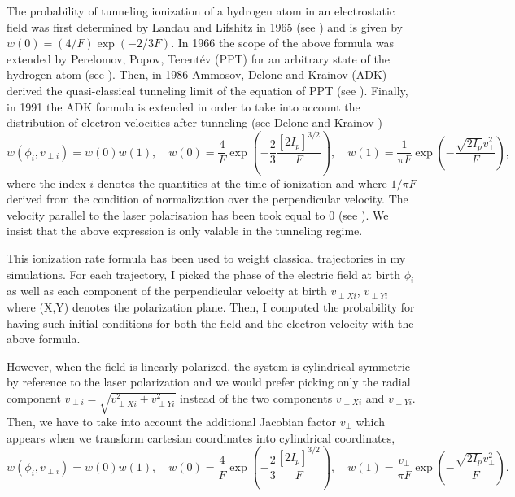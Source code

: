 \documentclass[a4paper]{article}
\begin{document}
The probability of tunneling ionization of a hydrogen atom in an electrostatic field was first determined by Landau and Lifshitz in 1965 (see \cite{Landau_1965}) and is given by $w(0)=(4/F)\exp(-2/3F)$. In 1966 the scope of the above formula was extended by Perelomov, Popov, Terent\'ev (PPT) for an arbitrary state of the hydrogen atom (see \cite{PPT_1966}). Then, in 1986 Ammosov, Delone and Krainov (ADK) derived the quasi-classical tunneling limit of the equation of PPT (see \cite{ADK_1986}). Finally, in 1991 the ADK formula is extended in order to take into account the distribution of electron velocities after tunneling (see Delone and Krainov \cite{Delone_1991})
\begin{equation} 
\label{ADK_distribution}
w(\phi_{i},v_{\perp i})=w(0)w(1), \quad w(0)=\frac{4}{F}\exp(-\frac{2}{3}\frac{[2I_{p}]^{3/2}}{F}), \quad w(1)=\frac{1}{\pi F}\exp(-\frac{\sqrt{2I_{p}}v_{\perp}^{2}}{F}),
\end{equation}
where the index $i$ denotes the quantities at the time of ionization and where $1/\pi F$ derived from the condition of normalization over the perpendicular velocity. 
The velocity parallel to the laser polarisation has been took equal to 0 (see \cite{Hu_1997}). We insist that the above expression is only valable in the tunneling regime.
\par
This ionization rate formula has been used to weight classical trajectories in my simulations. For each trajectory, I picked the phase of the electric field at birth $\phi_{i}$ as well as each component of the perpendicular velocity at birth $v_{\perp X i}$, $v_{\perp Y i}$ where (X,Y) denotes the polarization plane. Then, I computed the probability for having such initial conditions for both the field and the electron velocity with the above formula.
\par
However, when the field is linearly polarized, the system is cylindrical symmetric by reference to the laser polarization and we would prefer picking only the radial component $v_{\perp i}=\sqrt{v_{\perp X i}^{2} + v_{\perp Y i}^{2}}$ instead of the two components $v_{\perp X i}$ and $v_{\perp Y i}$. Then, we have to take into account the additional Jacobian factor $v_{\perp}$ which appears when we transform cartesian coordinates into cylindrical coordinates,
\begin{equation}
w(\phi_{i},v_{\perp i})=w(0)\bar w(1), \quad w(0)=\frac{4}{F}\exp(-\frac{2}{3}\frac{[2I_{p}]^{3/2}}{F}), \quad \bar w(1)=\frac{v_{\perp}}{\pi F}\exp(-\frac{\sqrt{2I_{p}}v_{\perp}^{2}}{F}).
\end{equation}
\end{document}
